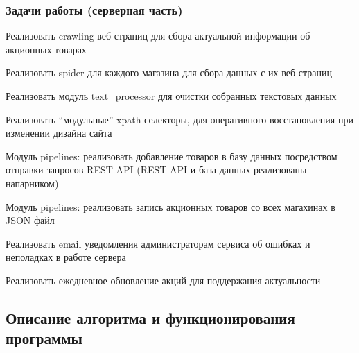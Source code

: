 \subsubsection{Задачи работы (серверная часть)}

\smallskip
\begin{my_enumerate}
    \item Реализовать crawling веб-страниц для сбора актуальной информации об акционных товарах
        \begin{my_enumerate}
            \item Реализовать spider для каждого магазина для сбора данных с их веб-страниц
            \item Реализовать модуль text\_processor для очистки собранных текстовых данных
            \item Реализовать ``модульные'' xpath селекторы, для оперативного восстановления при изменении дизайна сайта
        \end{my_enumerate}
    \item Модуль pipelines: реализовать добавление товаров в базу данных посредством отправки запросов REST API (REST API и база данных реализованы напарником)
    \item Модуль pipelines: реализовать запись акционных товаров со всех магахинах в JSON файл
    \item Реализовать email уведомления администраторам сервиса об ошибках и неполадках в работе сервера
    \item Реализовать ежедневное обновление акций для поддержания актуальности
\end{my_enumerate}


\subsection{Описание алгоритма и функционирования программы}

